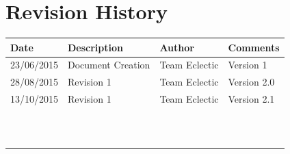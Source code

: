 \documentclass[11pt]{article}
\begin{document}


\setcounter{tocdepth}{3}
\setcounter{secnumdepth}{5}
\tableofcontents

\newpage
\section{Revision History}
\begin{table}[h]
\begin{tabular}{llll}
\textbf{Date}          & \textbf{Description}  & \textbf{Author}       & \textbf{Comments}   \\ \hline
\multicolumn{1}{|R{2cm}|}{23/06/2015} & \multicolumn{1}{L{4.5cm}|}{Document Creation} & \multicolumn{1}{l|}{Team Eclectic} & \multicolumn{1}{L{4cm}|}{Version 1} \\ \hline
\multicolumn{1}{|R{2cm}|}{28/08/2015} & \multicolumn{1}{L{4.5cm}|}{Revision 1} & \multicolumn{1}{l|}{Team Eclectic} & \multicolumn{1}{L{4cm}|}{Version 2.0} \\ \hline
\multicolumn{1}{|R{2cm}|}{13/10/2015} & \multicolumn{1}{L{4.5cm}|}{Revision 1} & \multicolumn{1}{l|}{Team Eclectic} & \multicolumn{1}{L{4cm}|}{Version 2.1} \\ \hline
\multicolumn{1}{|l|}{} & \multicolumn{1}{l|}{} & \multicolumn{1}{l|}{} & \multicolumn{1}{l|}{} \\ \hline
\multicolumn{1}{|l|}{} & \multicolumn{1}{l|}{} & \multicolumn{1}{l|}{} & \multicolumn{1}{l|}{} \\ \hline
\multicolumn{1}{|l|}{} & \multicolumn{1}{l|}{} & \multicolumn{1}{l|}{} & \multicolumn{1}{l|}{} \\ \hline
\multicolumn{1}{|l|}{} & \multicolumn{1}{l|}{} & \multicolumn{1}{l|}{} & \multicolumn{1}{l|}{} \\ \hline
\multicolumn{1}{|l|}{} & \multicolumn{1}{l|}{} & \multicolumn{1}{l|}{} & \multicolumn{1}{l|}{} \\ \hline
\multicolumn{1}{|l|}{} & \multicolumn{1}{l|}{} & \multicolumn{1}{l|}{} & \multicolumn{1}{l|}{} \\ \hline
\multicolumn{1}{|l|}{} & \multicolumn{1}{l|}{} & \multicolumn{1}{l|}{} & \multicolumn{1}{l|}{} \\ \hline
\multicolumn{1}{|l|}{} & \multicolumn{1}{l|}{} & \multicolumn{1}{l|}{} & \multicolumn{1}{l|}{} \\ \hline
\multicolumn{1}{|l|}{} & \multicolumn{1}{l|}{} & \multicolumn{1}{l|}{} & \multicolumn{1}{l|}{} \\ \hline
\multicolumn{1}{|l|}{} & \multicolumn{1}{l|}{} & \multicolumn{1}{l|}{} & \multicolumn{1}{l|}{} \\ \hline
\multicolumn{1}{|l|}{} & \multicolumn{1}{l|}{} & \multicolumn{1}{l|}{} & \multicolumn{1}{l|}{} \\ \hline
\end{tabular}
\end{table}
\end{document}
